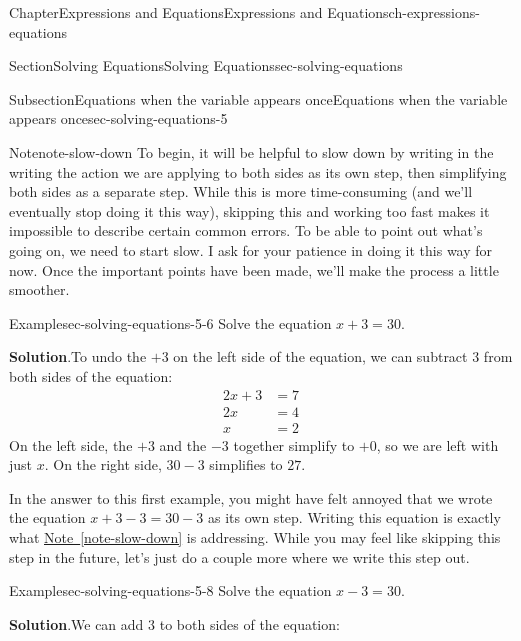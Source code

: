 \documentclass[twoside,11pt,]{book}
\newcommand{\blocktitlefont}{\relax}
\newcommand{\xreffont}{\relax}
\numberwithin{equation}{chapter}
\newcommand{\amp}{&}
\begin{document}
\begin{chapterptx}{Chapter}{Expressions and Equations}{}{Expressions and Equations}{}{}{ch-expressions-equations}
\begin{sectionptx}{Section}{Solving Equations}{}{Solving Equations}{}{}{sec-solving-equations}
\begin{subsectionptx}{Subsection}{Equations when the variable appears once}{}{Equations when the variable appears once}{}{}{sec-solving-equations-5}
\begin{note}{Note}{}{note-slow-down}%
To begin, it will be helpful to slow down by writing in the writing the action we are applying to both sides as its own step, then simplifying both sides as a separate step. While this is more time-consuming (and we'll eventually stop doing it this way), skipping this and working too fast makes it impossible to describe certain common errors. To be able to point out what's going on, we need to start slow. I ask for your patience in doing it this way for now. Once the important points have been made, we'll make the process a little smoother.%
\end{note}
\begin{example}{Example}{}{sec-solving-equations-5-6}%
Solve the equation \(x + 3 = 30\).%
\par\smallskip%
\noindent\textbf{\blocktitlefont Solution}.\hypertarget{sec-solving-equations-5-6-2}{}\quad{}To undo the \(+3\) on the left side of the equation, we can subtract \(3\) from both sides of the equation:%
\begin{align*}
2x + 3 \amp= 7\\
2x \amp= 4\\
x \amp= 2
\end{align*}
On the left side, the \(+3\) and the \(-3\) together simplify to \(+0\), so we are left with just \(x\). On the right side, \(30 - 3\) simplifies to \(27\).%
\end{example}
In the answer to this first example, you might have felt annoyed that we wrote the equation \(x+3-3 = 30-3\) as its own step. Writing this equation is exactly what \hyperref[note-slow-down]{Note~{\xreffont\ref{note-slow-down}}} is addressing. While you may feel like skipping this step in the future, let's just do a couple more where we write this step out.%
\begin{example}{Example}{}{sec-solving-equations-5-8}%
Solve the equation \(x - 3 = 30\).%
\par\smallskip%
\noindent\textbf{\blocktitlefont Solution}.\hypertarget{sec-solving-equations-5-8-2}{}\quad{}We can add \(3\) to both sides of the equation:%
\begin{equation*}
\begin{align*}
\end{align*}
\end{equation*}
%
\end{example}
\end{subsectionptx}
%
%
\typeout{************************************************}

\end{sectionptx}
\end{chapterptx}
\end{document}

